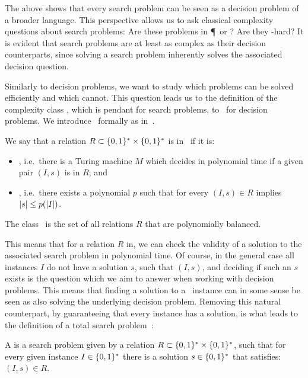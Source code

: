 The above shows that every search problem can be seen as a decision problem of a broader language. This perspective allows us to ask classical complexity questions about search problems: Are these problems in \P\ or \NP? Are they \NP-hard? It is evident that search problems are at least as complex as their decision counterparts, since solving a search problem inherently solves the associated decision question.

Similarly to decision problems, we want to study which problems can be solved efficiently and which cannot. This question leads us to the definition of the complexity class \FNP, which is pendant for search problems, to  \NP\ for decision problems. We introduce \FNP\ formally as in~.

\begin{definition}
	We say that a relation $R\subset \{0, 1\}^* \times \{0, 1\}^*$ is in \FNP\ if it is:
	\begin{itemize}
		\item {}, i.e.\ there is a Turing machine $M$ which decides in polynomial time if a given pair $(I, s)$ is in $R$; and
		\item  {}, i.e.\ there exists a polynomial $p$ such that for every $(I, s) \in R$ implies $\left\lvert s\right\rvert \leq p(\left\lvert I\right\rvert)$.
	\end{itemize}
	The class \FNP\ is the set of all relations $R$ that are polynomially balanced.
\end{definition}

This means that for a relation $R$ in, \FNP we can check the validity of a solution to the associated search problem in polynomial time. Of course, in the general case all instances $I$ do not have a solution $s$, such that $(I, s)$, and deciding if such an $s$ exists is the question which we aim to answer when working with decision problems. This means that finding a solution to a \FNP\ instance can in some sense be seen as also solving the underlying decision problem. Removing this natural counterpart, by guaranteeing that every instance has a solution, is what leads to the definition of a total search problem~\cite{megiddo_total_1991}:

\begin{definition}
	A  is a search problem given by a relation $R\subset \{0, 1\}^* \times \{0, 1\}^*$, such that for every given instance $I\in
		\{0, 1\}^*$ there is a solution $s \in \{0, 1\}^*$ that satisfies: $(I, s) \in R$.
\end{definition}

